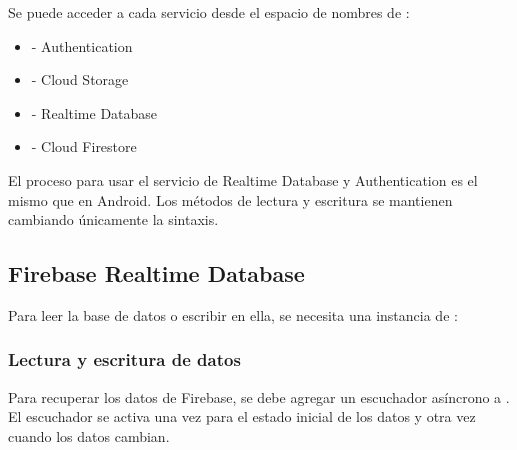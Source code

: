 Se puede acceder
a cada servicio desde el espacio de nombres de :
\begin{itemize}
\item {} 
 - Authentication

\item {} 
 - Cloud Storage

\item {} 
 - Realtime Database

\item {} 
 - Cloud Firestore

\end{itemize}

El proceso para usar el servicio de Realtime Database y Authentication
es el mismo que en Android. Los métodos de lectura y escritura
se mantienen cambiando únicamente la sintaxis.


\subsection*{Firebase Realtime Database}
\label{\detokenize{firebase_web:firebase-realtime-database}}

Para leer la base de datos o escribir en ella, se necesita una instancia de
:

%
\begin{sphinxVerbatim}[commandchars=\\\{\}]
          
   
\end{sphinxVerbatim}


\subsubsection*{Lectura y escritura de datos}
\label{\detokenize{firebase_web:lectura-y-escritura-de-datos}}
Para recuperar los datos de Firebase, se debe agregar un escuchador
asíncrono a . El escuchador se activa una vez para
el estado inicial de los datos y otra vez cuando los datos cambian.


